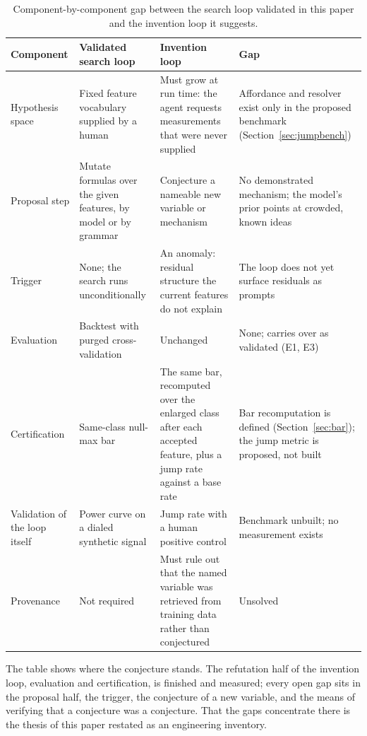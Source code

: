 \documentclass[11pt]{article}
\begin{document}
\begin{table}[htbp]
\centering
\caption{Component-by-component gap between the search loop validated in this paper and the invention
loop it suggests.}
\label{tab:gaps}
\small
\begin{tabular}{p{2.6cm} p{3.9cm} p{3.9cm} p{3.6cm}}
\toprule
Component & Validated search loop & Invention loop & Gap \\
\midrule
Hypothesis space & Fixed feature vocabulary supplied by a human & Must grow at run time: the agent
requests measurements that were never supplied & Affordance and resolver exist only in the proposed
benchmark (Section~\ref{sec:jumpbench}) \\
\addlinespace
Proposal step & Mutate formulas over the given features, by model or by grammar & Conjecture a nameable
new variable or mechanism & No demonstrated mechanism; the model's prior points at crowded, known
ideas \\
\addlinespace
Trigger & None; the search runs unconditionally & An anomaly: residual structure the current features
do not explain & The loop does not yet surface residuals as prompts \\
\addlinespace
Evaluation & Backtest with purged cross-validation & Unchanged & None; carries over as validated (E1,
E3) \\
\addlinespace
Certification & Same-class null-max bar & The same bar, recomputed over the enlarged class after each
accepted feature, plus a jump rate against a base rate & Bar recomputation is defined
(Section~\ref{sec:bar}); the jump metric is proposed, not built \\
\addlinespace
Validation of the loop itself & Power curve on a dialed synthetic signal & Jump rate with a human
positive control & Benchmark unbuilt; no measurement exists \\
\addlinespace
Provenance & Not required & Must rule out that the named variable was retrieved from training data
rather than conjectured & Unsolved \\
\bottomrule
\end{tabular}
\end{table}

The table shows where the conjecture stands. The refutation half of the invention loop, evaluation and
certification, is finished and measured; every open gap sits in the proposal half, the trigger, the
conjecture of a new variable, and the means of verifying that a conjecture was a conjecture. That the
gaps concentrate there is the thesis of this paper restated as an engineering inventory.
\end{document}
